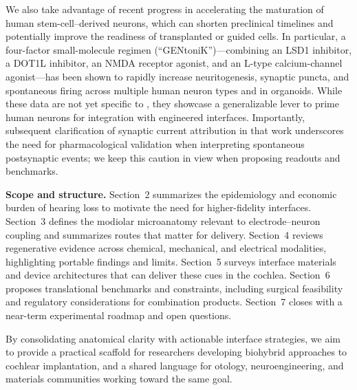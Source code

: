 We also take advantage of recent progress in accelerating the maturation of human stem-cell–derived neurons, which can shorten preclinical timelines and potentially improve the readiness of transplanted or guided cells. In particular, a four-factor small-molecule regimen (``GENtoniK'')---combining an LSD1 inhibitor, a DOT1L inhibitor, an NMDA receptor agonist, and an L-type calcium-channel agonist---has been shown to rapidly increase neuritogenesis, synaptic puncta, and spontaneous firing across multiple human neuron types and in organoids.\citep{Hergenreder2024NatBiotech} While these data are not yet specific to \SGNs, they showcase a generalizable lever to prime human neurons for integration with engineered interfaces. Importantly, subsequent clarification of synaptic current attribution in that work underscores the need for pharmacological validation when interpreting spontaneous postsynaptic events; we keep this caution in view when proposing readouts and benchmarks.

\textbf{Scope and structure.} Section~2 summarizes the epidemiology and economic burden of hearing loss to motivate the need for higher-fidelity interfaces. Section~3 defines the modiolar microanatomy relevant to electrode--neuron coupling and summarizes routes that matter for delivery. Section~4 reviews regenerative evidence across chemical, mechanical, and electrical modalities, highlighting portable findings and limits. Section~5 surveys interface materials and device architectures that can deliver these cues in the cochlea. Section~6 proposes translational benchmarks and constraints, including surgical feasibility and regulatory considerations for combination products. Section~7 closes with a near-term experimental roadmap and open questions.

By consolidating anatomical clarity with actionable interface strategies, we aim to provide a practical scaffold for researchers developing biohybrid approaches to cochlear implantation, and a shared language for otology, neuroengineering, and materials communities working toward the same goal.
